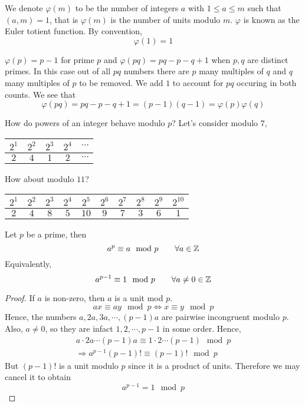 \documentclass{article}
\begin{document}
\begin{defi}
    We denote $\varphi(m)$ to be the number of integers $a$ with $1 \leq a \leq m$ such that $(a, m) = 1$, that is $\varphi(m)$ is the number of units modulo $m$.
    $\varphi$ is known as the Euler totient function.
    By convention,
    \[
        \varphi(1) =  1  
    \]
\end{defi}

\begin{eg}
    $\varphi(p) = p - 1$ for prime $p$ and $\varphi(pq) = pq - p - q + 1$ when $p, q$ are distinct primes. In this case out of all $pq$ numbers there are $p$ many multiples of $q$ and $q$ many multiples of $p$ to be removed. We add $1$ to account for $pq$ occuring in both counts. We see that
    \[
        \varphi(pq) = pq - p - q + 1 = (p-  1)(q - 1) = \varphi(p) \varphi(q)
    \]
\end{eg}

\begin{question}
    How do powers of an integer behave modulo $p$?
    Let's consider modulo $7$,
    \begin{center}
        \begin{tabular}{ccccc}
            $2^1$ & $2^2$ & $2^3$ & $2^4$ & $\cdots$\\
            \hline 
            $2$ & $4$ & $1$ & $2$ & $\cdots$
        \end{tabular}
    \end{center}
    How about modulo $11$?
    \begin{center}
        \begin{tabular}{cccccccccc}
            $2^1$ & $2^2$ & $2^3$ & $2^4$ & $2^5$ & $2^6$ & $2^7$ & $2^8$ & $2^9$ & $2^{10}$ \\
            \hline 
            $2$ & $4$ & $8$ & $5$ & $10$ & $9$ & $7$ & $3$ & $6$ & $1$
        \end{tabular}
    \end{center}
\end{question}

\begin{nthm}\label{th:2-13}
    Let $p$ be a prime, then
    \[
        a^p \equiv a \mod p \qquad \forall a \in \mathbb{Z}  
    \]
    Equivalently,
    \[
        a^{p-1} \equiv 1 \mod p \qquad \forall a \neq 0 \in \mathbb{Z}
    \]
\end{nthm}

\begin{proof}
    If $a$ is non-zero, then $a$ is a unit mod $p$.
    \[
        ax \equiv ay \mod p \Leftrightarrow x \equiv y \mod p  
    \]
    Hence, the numbers $a, 2a, 3a, \cdots, (p-1)a$ are pairwise incongruent modulo $p$.
    Also, $a \neq 0$, so they are infact $1, 2, \cdots, p-1$ in some order.
    Hence,
    \begin{align*}
        a \cdot 2a \cdots (p-1)a \equiv 1 \cdot 2 \cdots (p-1) \mod p \\
        \Rightarrow a^{p-1}(p-1)! \equiv (p-1)! \mod p
    \end{align*}
    But $(p-1)!$ is a unit modulo $p$ since it is a product of units. 
    Therefore we may cancel it to obtain
    \[
        a^{p-1} = 1 \mod p  
    \]
\end{proof}
\end{document}

